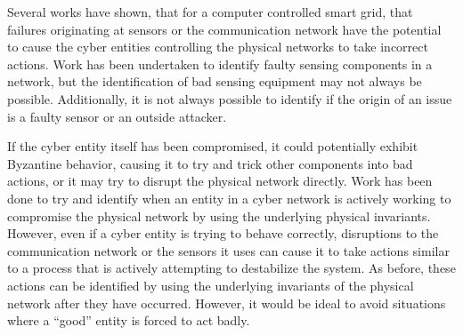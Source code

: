 Several works have shown\cite{Roth2012}\cite{HARINI}\cite{CYBERRESEARCHCALL}, that for a computer controlled smart grid, that failures originating at sensors or the communication network have the potential to cause the cyber entities controlling the physical networks to take incorrect actions.
Work has been undertaken to identify faulty sensing components in a network, but the identification of bad sensing equipment may not always be possible.
Additionally, it is not always possible to identify if the origin of an issue is a faulty sensor or an outside attacker.

If the cyber entity itself has been compromised, it could potentially exhibit Byzantine behavior, causing it to try and trick other components into bad actions\cite{Roth2012}, or it may try to disrupt the physical network directly.
Work has been done to try and identify when an entity in a cyber network is actively working to compromise the physical network by using the underlying physical invariants.
However, even if a cyber entity is trying to behave correctly, disruptions to the communication network or the sensors it uses can cause it to take actions similar to a process that is actively attempting to destabilize the system.
As before, these actions can be identified by using the underlying invariants of the physical network after they have occurred.
However, it would be ideal to avoid situations where a ``good'' entity is forced to act badly.

